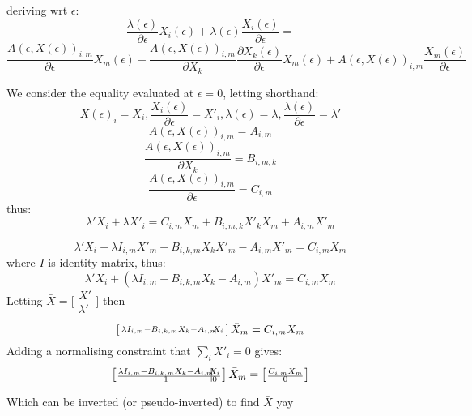 \documentclass{article}
\newcommand{\rvline}{\hspace*{-\arraycolsep}\vline\hspace*{-\arraycolsep}}
\begin{document}
deriving wrt $\epsilon$:
$$ \frac{\lambda(\epsilon)}{\partial \epsilon}X_{i}(\epsilon) + \lambda(\epsilon)\frac{X_{i}(\epsilon)}{\partial \epsilon} = $$
$$\frac{A(\epsilon,X(\epsilon))_{i,m}}{\partial \epsilon}X_{m}(\epsilon)
 + \frac{A(\epsilon,X(\epsilon))_{i,m}}{\partial X_{k}}\frac{\partial X_{k}(\epsilon)}{\partial \epsilon}X_{m}(\epsilon)
 + A(\epsilon,X(\epsilon))_{i,m}\frac{X_{m}(\epsilon)}{\partial \epsilon} $$

We consider the equality evaluated at $\epsilon=0$, letting shorthand:
$$X(\epsilon)_{i}=X_i, \frac{X_i(\epsilon)}{\partial \epsilon}=X'_i, \lambda(\epsilon)=\lambda, \frac{\lambda(\epsilon)}{\partial \epsilon}=\lambda'$$
$$A(\epsilon,X(\epsilon))_{i,m} = A_{i,m}$$
$$\frac{A(\epsilon,X(\epsilon))_{i,m}}{\partial X_{k}} = B_{i,m,k}$$
$$\frac{A(\epsilon,X(\epsilon))_{i,m}}{\partial \epsilon} = C_{i,m}$$
 thus:\\
$$\lambda'X_i+\lambda X'_i = C_{i,m}X_m + B_{i,m,k}X'_kX_m +A_{i,m}X'_m $$

$$\lambda'X_i+\lambda I_{i,m}X'_m - B_{i,k,m}X_kX'_m - A_{i,m}X'_m = C_{i,m}X_m $$
where $I$ is identity matrix, thus:
$$\lambda'X_i+\left(\lambda I_{i,m} - B_{i,k,m}X_k - A_{i,m}\right)X'_m = C_{i,m}X_m $$
Letting $\bar{X} = \bigl[ \begin{smallmatrix}X' \\\hline \lambda' \end{smallmatrix}\bigr]$ then
$$\left[\begin{smallmatrix}\lambda I_{i,m} - B_{i,k,m}X_k - A_{i,m} & \rvline & X_i \end{smallmatrix}\right]\bar{X}_m = C_{i,m}X_m $$
Adding a normalising constraint that $\sum_i X'_{i}=0$ gives:
$$\left[\begin{smallmatrix}\lambda I_{i,m} - B_{i,k,m}X_k - A_{i,m} & \rvline & X_i \\\hline 1 & \rvline & 0\end{smallmatrix}\right]\bar{X}_m = \left[\begin{smallmatrix} C_{i,m}X_m \\\hline 0\end{smallmatrix}\right] $$

Which can be inverted (or pseudo-inverted) to find $\bar{X}$ yay
\end{document}
